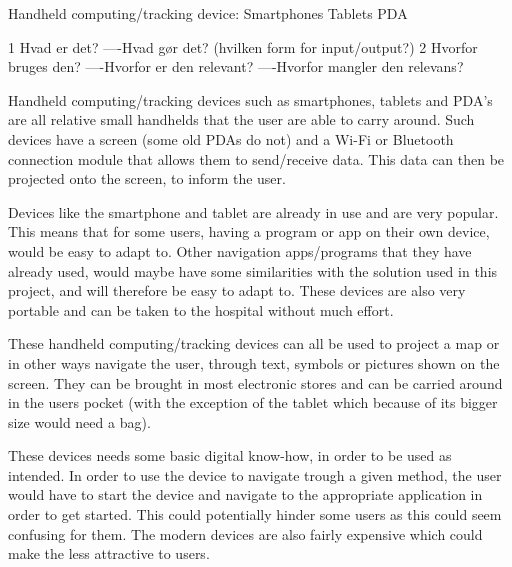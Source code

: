  Handheld computing/tracking device:
 	 Smartphones
 	 Tablets
 	 PDA
 	 
 	 
 	 1 Hvad er det?
 	 ----Hvad gør det? (hvilken form for input/output?)
 	 2 Hvorfor bruges den?
 	 ----Hvorfor er den relevant?
 	 ----Hvorfor mangler den relevans?
 	 
Handheld computing/tracking devices such as smartphones, tablets and PDA's are all relative small handhelds that the user are able to carry around. Such devices have a screen (some old PDAs do not) and a Wi-Fi or Bluetooth connection module that allows them to send/receive data. This data can then be projected onto the screen, to inform the user.

Devices like the smartphone and tablet are already in use and are very popular. This means that for some users, having a program or app on their own device, would be easy to adapt to. Other navigation apps/programs that they have already used, would maybe have some similarities with the solution used in this project, and will therefore be easy to adapt to. These devices are also very portable and can be taken to the hospital without much effort.  

These handheld computing/tracking devices can all be used to project a map or in other ways navigate the user, through text, symbols or pictures shown on the screen. They can be brought in most electronic stores and can be carried around in the users pocket (with the exception of the tablet which because of its bigger size would need a bag). 

These devices needs some basic digital know-how, in order to be used as intended. In order to use the device to navigate trough a given method, the user would have to start the device and navigate to the appropriate application in order to get started. This could potentially hinder some users as this could seem confusing for them. The modern devices are also fairly expensive which could make the less attractive to users.